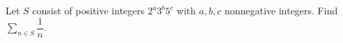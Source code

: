 Let $S$ consist of positive integers $2^a3^b5^c$ with $a,b,c$ nonnegative integers. Find $\displaystyle\sum_{n\in S}\dfrac{1}{n}$.
